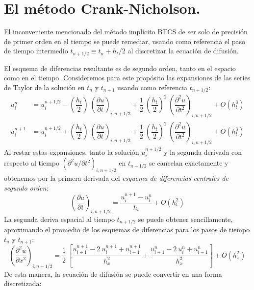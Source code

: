 \section{El método Crank-Nicholson.}
El inconveniente mencionado del método implícito BTCS de ser solo de precisión de primer orden en el tiempo se puede remediar, usando como referencia el paso de tiempo intermedio $t_{n+1/2} \equiv t_{n} + h_{t} / 2$ al discretizar la ecuación de difusión.
\par
El esquema de diferencias resultante es de segundo orden, tanto en el espacio como en el tiempo. Consideremos para este propósito las expansiones de las series de Taylor de la solución en $t_{n}$ y $t_{n+1}$ usando como referencia $t_{n + 1/2}$:
\begin{align*}
u_{i}^{n} &= u_{i}^{n+1/2}	- \left( \dfrac{h_{t}}{2} \right) \: \left( \dfrac{\partial u}{\partial t} \right)_{{i, n+1/2}} + \dfrac{1}{2} \: \left( \dfrac{h_{t}}{2} \right)^{2} \: \left( \dfrac{\partial^{2} u}{\partial t^{2}} \right)_{{i, n+1/2}} + O(h_{t}^{3}) \\
u_{i}^{n+1} &= u_{i}^{n+1/2} + \left( \dfrac{h_{t}}{2} \right) \: \left( \dfrac{\partial u}{\partial t} \right)_{{i, n+1/2}} + \dfrac{1}{2} \: \left( \dfrac{h_{t}}{2} \right)^{2} \: \left( \dfrac{\partial^{2} u}{\partial t^{2}} \right)_{{i, n+1/2}} + O(h_{t}^{3})
\end{align*}
Al restar estas expansiones, tanto la solución $u_{i}^{n+1/2}$ y la segunda derivada con respecto al tiempo $(\partial^{2} u / \partial t^{2})_{i, n+1/2}$ en $t_{n+1/2}$ se cancelan exactamente y obtenemos por la primera derivada del \emph{esquema de diferencias centrales de segundo orden}:
\begin{equation}
\left( \dfrac{\partial u}{\partial t} \right)_{i, n+1/2} = \dfrac{u_{i}^{n+1} - u_{i}^{n}}{h_{t}} + O(h_{t}^{2})
\label{eq:ecuacion_13_71}
\end{equation}
La segunda deriva espacial al tiempo $t_{n+1/2}$ se puede obtener sencillamente, aproximando el promedio de los esquemas de diferencias para los pasos de tiempo $t_{n}$ y $t_{n+1}$:
\begin{equation}
\left( \dfrac{\partial^{2} u }{\partial x^{2}} \right)_{i, n+1/2} = \dfrac{1}{2} \: \left[ \dfrac{u_{i+1}^{n+1} - 2 \: u_{i}^{n+1} + u_{i-1}^{n+1}}{h_{x}^{2}} + \dfrac{u_{i+1}^{n} - 2 \: u_{i}^{n} + u_{i-1}^{n}}{h_{x}^{2}} \right] + O(h_{x}^{2})
\label{eq:ecuacion_13_72}
\end{equation}
De esta manera, la ecuación de difusión se puede convertir en una forma discretizada:
